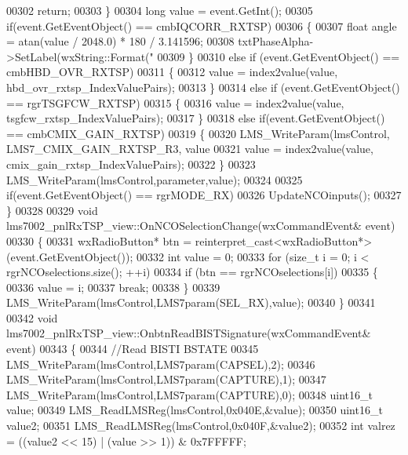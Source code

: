 \begin{DoxyCode}
{{{00302         \textcolor{keywordflow}{return};
00303     \}
00304     \textcolor{keywordtype}{long} value = \textcolor{keyword}{event}.GetInt();
00305     \textcolor{keywordflow}{if}(event.GetEventObject() == cmbIQCORR_RXTSP)
00306     \{
00307         \textcolor{keywordtype}{float} angle = atan(value / 2048.0) * 180 / 3.141596;
00308         txtPhaseAlpha->SetLabel(wxString::Format(\textcolor{stringliteral}{"%
00309     \}
00310     \textcolor{keywordflow}{else} \textcolor{keywordflow}{if} (event.GetEventObject() == cmbHBD_OVR_RXTSP)
00311     \{
00312         value = index2value(value, hbd_ovr_rxtsp_IndexValuePairs);
00313     \}
00314     \textcolor{keywordflow}{else} \textcolor{keywordflow}{if} (event.GetEventObject() == rgrTSGFCW_RXTSP)
00315     \{
00316         value = index2value(value, tsgfcw_rxtsp_IndexValuePairs);
00317     \}
00318     \textcolor{keywordflow}{else} \textcolor{keywordflow}{if}(event.GetEventObject() == cmbCMIX_GAIN_RXTSP)
00319     \{
00320         LMS_WriteParam(lmsControl, LMS7_CMIX_GAIN_RXTSP_R3, value %
00321         value = index2value(value, cmix_gain_rxtsp_IndexValuePairs);
00322     \}
00323     LMS_WriteParam(lmsControl,parameter,value);
00324 
00325     \textcolor{keywordflow}{if}(event.GetEventObject() == rgrMODE_RX)
00326         UpdateNCOinputs();
00327 \}
00328 
00329 \textcolor{keywordtype}{void} lms7002_pnlRxTSP_view::OnNCOSelectionChange(wxCommandEvent& event)
00330 \{
00331     wxRadioButton* btn = \textcolor{keyword}{reinterpret\_cast<}wxRadioButton*\textcolor{keyword}{>}(\textcolor{keyword}{event}.GetEventObject());
00332     \textcolor{keywordtype}{int} value = 0;
00333     \textcolor{keywordflow}{for} (\textcolor{keywordtype}{size\_t} i = 0; i < rgrNCOselections.size(); ++i)
00334         \textcolor{keywordflow}{if} (btn == rgrNCOselections[i])
00335         \{
00336             value = i;
00337             \textcolor{keywordflow}{break};
00338         \}
00339     LMS_WriteParam(lmsControl,LMS7param(SEL_RX),value);
00340 \}
00341 
00342 \textcolor{keywordtype}{void} lms7002_pnlRxTSP_view::OnbtnReadBISTSignature(wxCommandEvent& event)
00343 \{
00344     \textcolor{comment}{//Read BISTI BSTATE}
00345     LMS_WriteParam(lmsControl,LMS7param(CAPSEL),2);
00346     LMS_WriteParam(lmsControl,LMS7param(CAPTURE),1);
00347     LMS_WriteParam(lmsControl,LMS7param(CAPTURE),0);
00348     uint16\_t value;
00349     LMS_ReadLMSReg(lmsControl,0x040E,&value);
00350     uint16\_t value2;
00351     LMS_ReadLMSReg(lmsControl,0x040F,&value2);
00352     \textcolor{keywordtype}{int} valrez = ((value2 << 15) | (value >> 1)) & 0x7FFFFF;
}}}}
\end{DoxyCode}
